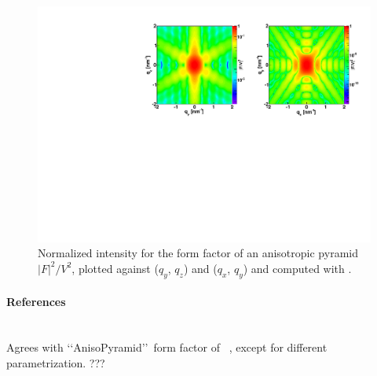 \begin{figure}[ht]
\begin{center}
\includegraphics[angle=-90,width=\textwidth]{fig/ff/figffanisopyramid.pdf}
\end{center}
\caption{Normalized intensity for the form factor of an anisotropic
  pyramid $|F|^2/V^2$, plotted against ($q_y$, $q_z$) and  ($q_x$, $q_y$) and computed with .}
\label{fig:FFAnisoPyramidEx}
\end{figure}

\paragraph{References}\strut\\
Agrees with \lq\lq AnisoPyramid\rq\rq\ form factor of \IsGISAXS~\cite{Laz02},
except for different parametrization. ???


